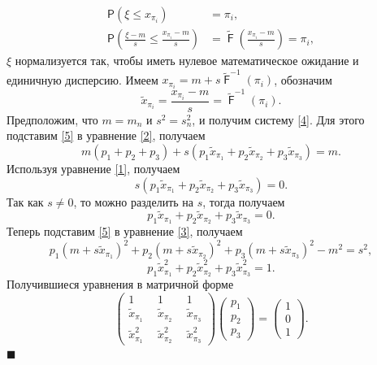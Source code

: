\documentclass[12pt]{article}
\newenvironment{Proof}{\par\noindent{\bf Доказательство.}}{\hfill$\scriptstyle\blacksquare$}
\DeclareMathOperator{\F}{\mathsf{F}}
\begin{document}
	\begin{Proof}
		\begin{align*}
			\mathsf{P}(\xi \leq x_{\pi_{i}}) &= \pi_{i},\\
			\mathsf{P}\left(\frac{\xi-m}{s}\leq \frac{x_{\pi_{i}}-m}{s}\right) &=  \tilde{\F}\left(\frac{x_{\pi_{i}}-m}{s}\right)=\pi_{i},
		\end{align*}
		$\xi$ нормализуется так, чтобы иметь нулевое математическое ожидание и единичную дисперсию.
		Имеем $x_{\pi_{i}} = m+s\tilde{\F}^{-1}(\pi_{i})$, обозначим
		\begin{equation}
			\tilde{x}_{\pi_{i}} = \dfrac{x_{\pi_{i}}-m}{s}=\tilde{\F}^{-1}(\pi_{i}). \label{5}
		\end{equation}
	Предположим, что $m=m_{n}$ и $s^{2} = s_{n}^{2}$, и получим систему \eqref{4}.
	Для этого подставим \eqref{5} в уравнение \eqref{2}, получаем
	\begin{equation*}
		m(p_{1} + p_{2} + p_{3})+s(p_{1}\tilde{x}_{\pi_1}+p_{2}\tilde{x}_{\pi_{2}}+p_{3}\tilde{x}_{\pi_{3}})=m.
	\end{equation*}
Используя уравнение \eqref{1}, получаем
\begin{equation*}
	s(p_{1}\tilde{x}_{\pi_1}+p_{2}\tilde{x}_{\pi_{2}}+p_{3}\tilde{x}_{\pi_{3}})=0.
\end{equation*}
Так как $s \neq 0$, то можно разделить на $s$, тогда получаем
\begin{equation*}
	p_{1}\tilde{x}_{\pi_1}+p_{2}\tilde{x}_{\pi_{2}}+p_{3}\tilde{x}_{\pi_{3}}=0.
\end{equation*}
Теперь подставим \eqref{5} в уравнение \eqref{3}, получаем
\begin{equation*}
	p_{1}(m+s\tilde{x}_{\pi_{1}})^{2}+p_{2}(m+s\tilde{x}_{\pi_{2}})^{2}+p_{3}(m+s\tilde{x}_{\pi_{3}})^{2} - m^{2} = s^{2},
\end{equation*}
\begin{equation*}
	p_{1}\tilde{x}_{\pi_{1}}^{2}+p_{2}\tilde{x}_{\pi_{2}}^{2}+p_{3}\tilde{x}_{\pi_{3}}^{2} = 1.
\end{equation*}
	Получившиеся уравнения в матричной форме
\begin{equation}
	\begin{pmatrix} 
		1&1&1\\ 
		\tilde{x}_{\pi_{1}}~~ &  \tilde{x}_{\pi_{2}}~~  & \tilde{x}_{\pi_{3}} \\ 
		\tilde{x}_{\pi_{1}}^{2}~~&\tilde{x}_{\pi_{2}}^{2}~~  &\tilde{x}_{\pi_{3}}^{2}
	\end{pmatrix}
	\begin{pmatrix}p_{1}\\p_{2}\\ p_{3}\end{pmatrix}= \begin{pmatrix}1\\0\\1 \end{pmatrix}. \label{6}
\end{equation}
	\end{Proof}
	
\end{document}
